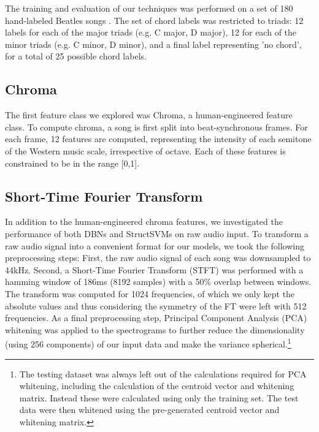 \documentclass{article}
\begin{document}
The training and evaluation of our techniques was performed on a set of 180
hand-labeled Beatles songs \cite{harte2010towards}. The set of chord labels was
restricted to triads: 12 labels for each of the major triads (e.g. C major, D
major), 12 for each of the minor triads (e.g. C minor, D minor), and a final
label representing 'no chord', for a total of 25 possible chord labels.

\subsection{Chroma}

The first feature class we explored was Chroma, a human-engineered feature
class. To compute chroma, a song is first split into beat-synchronous frames.
For each frame, 12 features are computed, representing the intensity of each
semitone of the Western music scale, irrespective of octave. Each of these
features is constrained to be in the range [0,1].

\subsection{Short-Time Fourier Transform}

In addition to the human-engineered chroma features, we investigated the
performance of both DBNs and StructSVMs on raw audio input. To transform a raw
audio signal into a convenient format for our models, we took the following
preprocessing steps: First, the raw audio signal of each song was downsampled
to 44kHz. Second, a Short-Time Fourier Transform (STFT) was performed with a
hamming window of 186ms (8192 samples) with a 50\% overlap between windows. The
transform was computed for 1024 frequencies, of which we only kept the absolute
values and thus considering the symmetry of the FT were left with 512
frequencies. As a final preprocessing step, Principal Component Analysis (PCA)
whitening was applied to the spectrograms to further reduce the dimensionality
(using 256 components) of our input data and make the variance
spherical.\footnote{The testing dataset was always left out of the
  calculations required for PCA whitening, including the calculation of the
centroid vector and whitening matrix.  Instead these were calculated using only
the training set. The test data were then whitened using the pre-generated
centroid vector and whitening matrix.}
\end{document}
